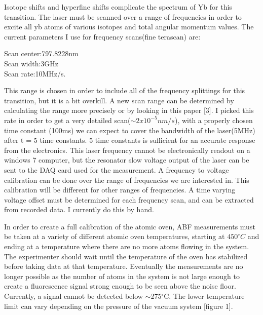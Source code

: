 \documentclass[12pt, a4paper]{article}
\begin{document}
Isotope shifts and hyperfine shifts complicate the spectrum of Yb for this transition. The laser must be scanned over a range of frequencies in order to excite all yb atoms of various isotopes and total angular momentum values. The current parameters I use for frequency scans(fine terascan) are:\\
\begin{center}
Scan center:797.8228nm\\
Scan width:3GHz\\
Scan rate:10MHz/s.\\
\end{center}
This range is chosen in order to include all of the frequency splittings for this transition, but it is a bit overkill.  A new scan range can be determined by calculating the range more precisely or by looking in this paper [3]. I picked this rate in order to get a very detailed scan($\sim 2x10^{-5}nm/s$), with a properly chosen time constant (100ms) we can expect to cover the bandwidth of the laser(5MHz) after t = 5 time constants. 5 time constants is sufficient for an accurate response from the electronics. This laser frequency cannot be electronically readout on a windows 7 computer, but the resonator slow voltage output of the laser can be sent to the DAQ card used for the measurement. A frequency to voltage calibration can be done over the range of frequencies we are interested in. This calibration will be different for other ranges of frequencies. A time varying voltage offset must be determined for each frequency scan, and can be extracted from recorded data. I currently do this by hand.

In order to create a full calibration of the atomic oven, ABF measurements must be taken at a variety of different atomic oven temperatures, starting at $450^{\circ}C$ and ending at a temperature where there are no more atoms flowing in the system. The experimenter should wait until the temperature of the oven has stabilized before taking data at that temperature. Eventually the measurements are no longer possible as the number of atoms in the system is not large enough to create a fluorescence signal strong enough to be seen above the noise floor. Currently, a signal cannot be detected below $\sim$275$^{\circ}$C. The lower temperature limit can vary depending on the pressure of the vacuum system [figure 1].
\end{document}
